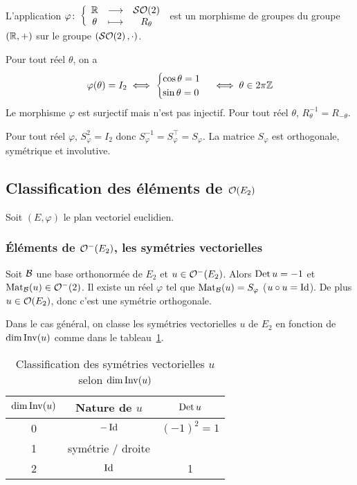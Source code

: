 \begin{corth}
  L'application \(\varphi\colon\left\{\begin{array}{ccc}\mathbb{R} & \longrightarrow &\mathcal{SO}\!\left(2\right)\\\theta & \longmapsto & R_\theta\end{array}\right.\) est 
  un morphisme de groupes du groupe \((\mathbb{R},+)\) sur le groupe 
  \((\mathcal{SO}\!\left(2\right),\cdot)\).
\end{corth}
Pour tout réel \(\theta\), on a
\begin{equation}
  \varphi(\theta)=I_2 \iff \begin{cases} \cos\theta =1 \\ 
  \sin\theta=0\end{cases} \iff \theta \in 2\pi\mathbb{Z}
\end{equation}
Le morphisme \(\varphi\) est surjectif mais n'est pas injectif. Pour tout 
réel \(\theta\), \(R_\theta^{-1} = R_{-\theta}\).

\begin{corth}
  Pour tout réel \(\varphi\), \(S_\varphi^2=I_2\) donc 
  \(S_\varphi^{-1}=S_\varphi^\top=S_\varphi\). La matrice \(S_\varphi\) est 
  orthogonale, symétrique et involutive.
\end{corth}

\subsection{Classification des éléments de \(\mathcal{O}\!\left(E_2\right)\)}

Soit \((E,\varphi)\) le plan vectoriel euclidien.

\subsubsection{Éléments de \(\mathcal{O}^{-}\!\left(E_2\right)\), les symétries vectorielles}

Soit \(\mathcal{B}\) une base orthonormée de \(E_2\) et \(u \in \mathcal{O}^{-}\!\left(E_2\right)\). 
Alors \(\operatorname{Det} u=-1\) et \(\mathrm{Mat}_{\mathcal{B}}(u) \in \mathcal{O}^{-}\!\left(2\right)\). Il existe un réel 
\(\varphi\) tel que \(\mathrm{Mat}_{\mathcal{B}}(u)=S_\varphi\) (\(u \circ u=\operatorname{Id}\)). De plus 
\(u \in \mathcal{O}\!\left(E_2\right)\), donc c'est une symétrie orthogonale. 

Dans le cas général, on classe les symétries vectorielles \(u\) de \(E_2\) 
en fonction de \(\operatorname{dim} \operatorname{Inv}(u)\) comme dans le tableau~\ref{tab:SymVect}.

\begin{table}[!h]
  \centering
  \begin{tabular}{|c|c|c|}\hline
    \(\operatorname{dim}\operatorname{Inv}(u)\) & Nature de \(u\) & \(\operatorname{Det} u\) \\ \hline
    0 & \(-\operatorname{Id}\) & \((-1)^2=1\) \\
    1 & symétrie / droite & \\
    2 & \(\operatorname{Id}\) & 1 \\
    \hline
  \end{tabular}
  \caption{Classification des symétries vectorielles \(u\) selon 
  \(\operatorname{dim}\operatorname{Inv}(u)\)}
  \label{tab:SymVect}
\end{table}

